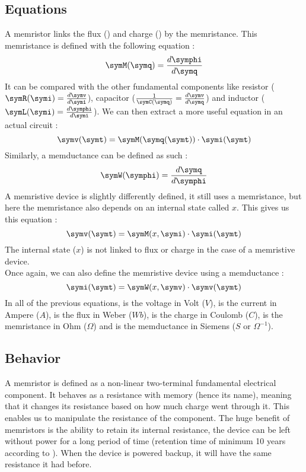 \subsection{Equations}
A memristor links the flux (\symphi) and charge (\symq) by the memristance.
This memristance is defined with the following equation :
\begin{equation}
  \symM(\symq)=\frac{d\symphi}{d\symq}
\end{equation}
It can be compared with the other fundamental components like resistor ($\symR(\symi)=\frac{d\symv}{d\symi}$), capacitor ($\frac{1}{\symC(\symq)}=\frac{d\symv}{d\symq}$) and inductor ($\symL(\symi)=\frac{d\symphi}{d\symi}$).
We can then extract a more useful equation in an actual circuit :
\begin{equation}
  \symv(\symt)=\symM(\symq(\symt))\cdot \symi(\symt)
\end{equation}
Similarly, a memductance can be defined as such :
\begin{equation}
  \symW(\symphi)=\frac{d\symq}{d\symphi}
\end{equation}
A memristive device is slightly differently defined, it still uses a memristance, but here the memristance also depends on an internal state called $x$. This gives us this equation :
\begin{equation}\label{eq:memristiveDev}
  \symv(\symt)=\symM(x,\symi)\cdot \symi(\symt)
\end{equation}
The internal state ($x$) is not linked to flux or charge in the case of a memristive device.\\
Once again, we can also define the memristive device using a memductance :
\begin{equation}
  \symi(\symt)=\symW(x,\symv)\cdot \symv(\symt)
\end{equation}
In all of the previous equations, \symv is the voltage in Volt ($V$), \symi is the current in Ampere ($A$), \symphi is the flux in Weber ($Wb$), \symq is the charge in Coulomb ($C$), \symM is the memristance in Ohm ($\Omega$) and \symW is the memductance in Siemens ($S$ or $\Omega^{-1}$).

\subsection{Behavior}

A memristor is defined as a non-linear two-terminal fundamental electrical component. It behaves as a resistance with memory (hence its name), meaning that it changes its resistance based on how much charge went through it. This enables us to manipulate the resistance of the component.
The huge benefit of memristors is the ability to retain its internal resistance, the device can be left without power for a long period of time (retention time of minimum 10 years according to \cite{memRetention}). When the device is powered backup, it will have the same resistance it had before.

